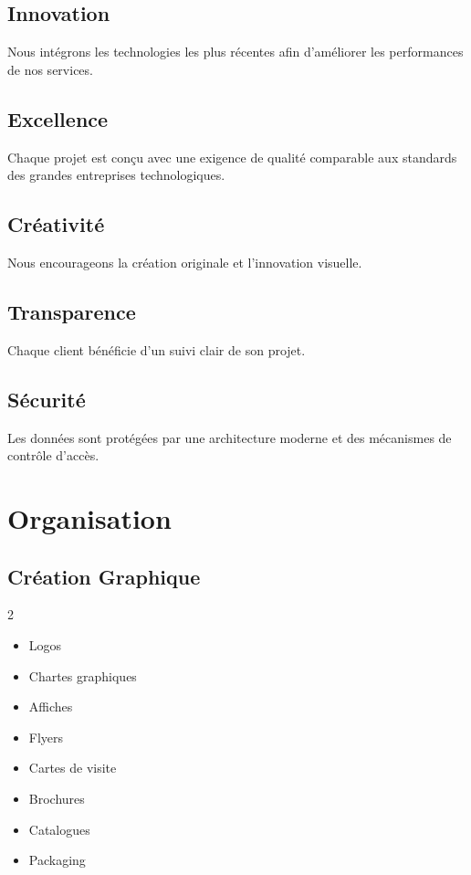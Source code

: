 \documentclass[12pt,a4paper,oneside]{book}
\begin{document}
\section{Innovation}
Nous intégrons les technologies les plus récentes afin d'améliorer les performances de nos services.

\section{Excellence}
Chaque projet est conçu avec une exigence de qualité comparable aux standards des grandes entreprises technologiques.

\section{Créativité}
Nous encourageons la création originale et l'innovation visuelle.

\section{Transparence}
Chaque client bénéficie d'un suivi clair de son projet.

\section{Sécurité}
Les données sont protégées par une architecture moderne et des mécanismes de contrôle d'accès.

\chapter{Organisation}

\section{Création Graphique}
\begin{multicols}{2}
\begin{itemize}
\item Logos
\item Chartes graphiques
\item Affiches
\item Flyers
\item Cartes de visite
\item Brochures
\item Catalogues
\item Packaging
\end{itemize}
\end{multicols}
\end{document}
